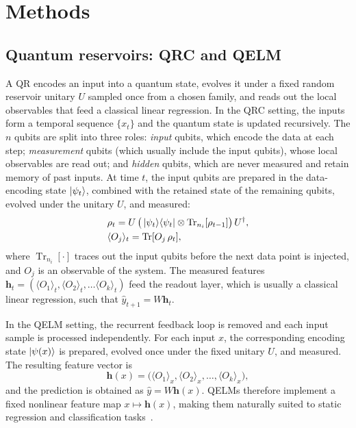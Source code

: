 \documentclass[
    aps,
    pre,
    amsmath,
    amssymb,
    reprint,
    superscriptaddress,
    preprintnumbers,
]{revtex4-2}
\begin{document}
\section{Methods}
\label{sec:methods}
\subsection{Quantum reservoirs: QRC and QELM}
\label{sec:methods-qr}

A QR encodes an input into a quantum state, evolves it under a fixed random reservoir unitary $U$ sampled once from a chosen family, and reads out the local observables that feed a classical linear regression. In the QRC setting, the inputs form a temporal sequence $\{x_t\}$ and the quantum state is updated recursively. The $n$ qubits are split into three roles: \emph{input} qubits, which encode the data at each step; \emph{measurement} qubits (which usually include the input qubits), whose local observables are read out; and
\emph{hidden} qubits, which are never measured and retain memory of past inputs. At time $t$, the input qubits are prepared in the data-encoding state $\ket{\psi_t}$, combined with the retained state of the remaining qubits, evolved under the unitary $U$, and measured:
\begin{eqnarray}
    &\rho_t = U\,\big(\ket{\psi_t}\!\bra{\psi_t}\otimes
    \operatorname{Tr}_{n_i}[\rho_{t-1}]\big)\,U^\dagger, \\ \nonumber
    &\langle O_j\rangle_t = \operatorname{Tr}[O_j\,\rho_t],
\end{eqnarray}
where $\operatorname{Tr}_{n_i}[\cdot]$ traces out the input qubits before the next data point is injected, and $O_j$ is an observable of the system. The measured features $\mathbf{h}_t = (\langle O_1\rangle_t, \langle O_2\rangle_t, \ldots \langle O_k\rangle_t)$ feed the readout layer, which is usually a classical linear regression, such that $\hat{y}_{t+1} = W\mathbf{h}_t$.

In the QELM setting, the recurrent feedback loop is removed and each input sample is processed independently. For each input $x$, the corresponding encoding state $\ket{\psi(x)}$ is prepared, evolved once under the fixed unitary $U$, and measured. The resulting feature vector is
\begin{equation}
    \mathbf{h}(x)=\big(\langle O_1\rangle_x,\langle O_2\rangle_x,\ldots,\langle O_k\rangle_x\big),
\end{equation}
and the prediction is obtained as $\hat{y}=W\mathbf{h}(x)$. QELMs therefore implement a fixed nonlinear feature map $x\mapsto \mathbf{h}(x)$, making them naturally suited to static regression and classification tasks~\cite{xiong2024fundamental}.
\end{document}
